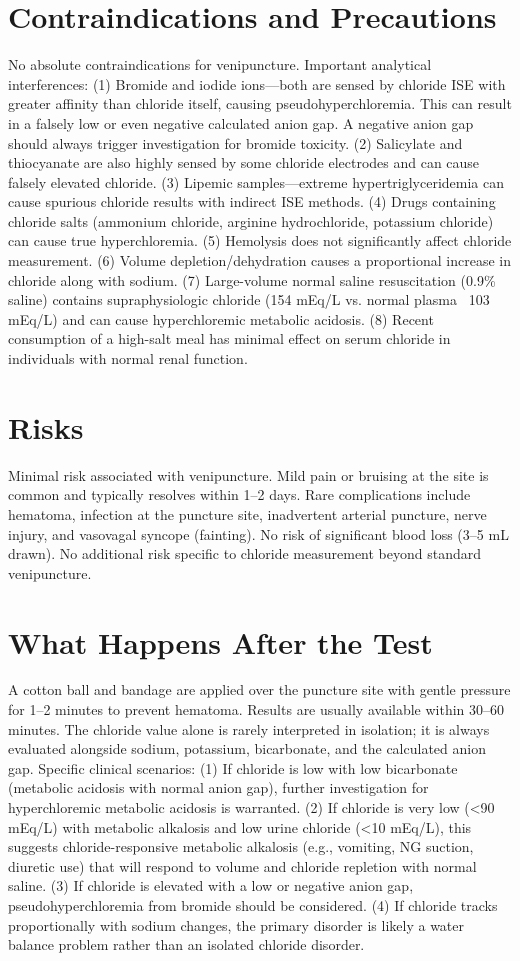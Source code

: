 \section*{Contraindications and Precautions}
No absolute contraindications for venipuncture. Important analytical interferences: (1) Bromide and iodide ions---both are sensed by chloride ISE with greater affinity than chloride itself, causing pseudohyperchloremia. This can result in a falsely low or even negative calculated anion gap. A negative anion gap should always trigger investigation for bromide toxicity. (2) Salicylate and thiocyanate are also highly sensed by some chloride electrodes and can cause falsely elevated chloride. (3) Lipemic samples---extreme hypertriglyceridemia can cause spurious chloride results with indirect ISE methods. (4) Drugs containing chloride salts (ammonium chloride, arginine hydrochloride, potassium chloride) can cause true hyperchloremia. (5) Hemolysis does not significantly affect chloride measurement. (6) Volume depletion/dehydration causes a proportional increase in chloride along with sodium. (7) Large-volume normal saline resuscitation (0.9\% saline) contains supraphysiologic chloride (154 mEq/L vs. normal plasma ~103 mEq/L) and can cause hyperchloremic metabolic acidosis. (8) Recent consumption of a high-salt meal has minimal effect on serum chloride in individuals with normal renal function.

\section*{Risks}
Minimal risk associated with venipuncture. Mild pain or bruising at the site is common and typically resolves within 1--2 days. Rare complications include hematoma, infection at the puncture site, inadvertent arterial puncture, nerve injury, and vasovagal syncope (fainting). No risk of significant blood loss (3--5 mL drawn). No additional risk specific to chloride measurement beyond standard venipuncture.

\section*{What Happens After the Test}
A cotton ball and bandage are applied over the puncture site with gentle pressure for 1--2 minutes to prevent hematoma. Results are usually available within 30--60 minutes. The chloride value alone is rarely interpreted in isolation; it is always evaluated alongside sodium, potassium, bicarbonate, and the calculated anion gap. Specific clinical scenarios: (1) If chloride is low with low bicarbonate (metabolic acidosis with normal anion gap), further investigation for hyperchloremic metabolic acidosis is warranted. (2) If chloride is very low (<90 mEq/L) with metabolic alkalosis and low urine chloride (<10 mEq/L), this suggests chloride-responsive metabolic alkalosis (e.g., vomiting, NG suction, diuretic use) that will respond to volume and chloride repletion with normal saline. (3) If chloride is elevated with a low or negative anion gap, pseudohyperchloremia from bromide should be considered. (4) If chloride tracks proportionally with sodium changes, the primary disorder is likely a water balance problem rather than an isolated chloride disorder.

